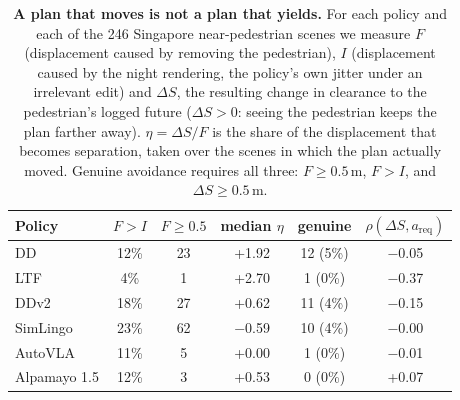 \begin{table}[t]
\centering
\caption{\textbf{A plan that moves is not a plan that yields.} For each policy and each of the 246 Singapore near-pedestrian scenes we measure $F$ (displacement caused by removing the pedestrian), $I$ (displacement caused by the night rendering, the policy's own jitter under an irrelevant edit) and $\Delta S$, the resulting change in clearance to the pedestrian's logged future ($\Delta S>0$: seeing the pedestrian keeps the plan farther away). $\eta=\Delta S/F$ is the share of the displacement that becomes separation, taken over the scenes in which the plan actually moved. Genuine avoidance requires all three: $F\ge0.5$\,m, $F>I$, and $\Delta S\ge0.5$\,m.}
\label{tab:decomp}
\scriptsize
\setlength{\tabcolsep}{3pt}
\begin{tabular}{@{}lccccc@{}}
\toprule
Policy & $F>I$ & $F\ge0.5$ & median $\eta$ & genuine & $\rho(\Delta S,a_{\mathrm{req}})$ \\
\midrule
DD & 12\% & 23 & +1.92 & 12 (5\%) & $-$0.05 \\
LTF & 4\% & 1 & +2.70 & 1 (0\%) & $-$0.37 \\
DDv2 & 18\% & 27 & +0.62 & 11 (4\%) & $-$0.15 \\
SimLingo & 23\% & 62 & $-$0.59 & 10 (4\%) & $-$0.00 \\
AutoVLA & 11\% & 5 & +0.00 & 1 (0\%) & $-$0.01 \\
Alpamayo 1.5 & 12\% & 3 & +0.53 & 0 (0\%) & +0.07 \\
\bottomrule
\end{tabular}
\end{table}
